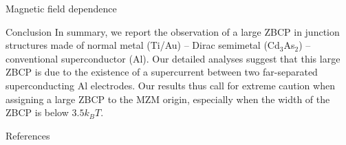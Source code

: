 \documentclass[final]{beamer}
\newlength{\onecolwid}
\begin{document}
\begin{frame}[t]
\begin{columns}[t]
\begin{column}{\onecolwid}
\begin{block}{Magnetic field dependence}
\end{block}

\begin{block}{Conclusion}
In summary, we report the observation of a large ZBCP in junction structures made of
normal metal (Ti/Au) – Dirac semimetal (Cd$_3$As$_2$) – conventional
superconductor (Al). Our detailed analyses suggest that this large ZBCP 
is due to the existence of a supercurrent between two far-separated
superconducting Al electrodes. Our results thus call for extreme caution when
assigning a large ZBCP to the MZM origin, especially when the width of the ZBCP
is below $3.5k_B T$.  
\end{block}




\begin{block}{References}

\nocite{*} %
\small{
\vspace{0.75in}}

\end{block}



\end{column} %

\end{columns} %

\end{frame} %
\end{document}
